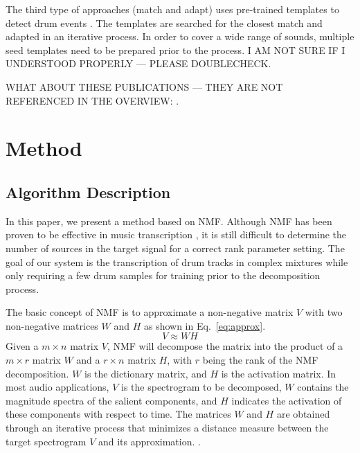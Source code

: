 \documentclass{article}
\begin{document}
The third type of approaches (match and adapt) uses pre-trained templates to detect drum events \cite{yoshii_automatic_2004, yoshii_drum_2007}. The templates are searched for the closest match and adapted in an iterative process. In order to cover a wide range of sounds, multiple seed templates need to be prepared prior to the process. I AM NOT SURE IF I UNDERSTOOD PROPERLY --- PLEASE DOUBLECHECK.
 
WHAT ABOUT THESE PUBLICATIONS --- THEY ARE NOT REFERENCED IN THE OVERVIEW: \cite{scholler_sparse_2011}.

\section{Method}\label{sec:method}
\subsection{Algorithm Description}\label{subsec:algorithm description}

In this paper, we present a method based on NMF. Although NMF has been proven to be effective in music transcription \cite{smaragdis_non-negative_2003}, it is still difficult to determine the number of sources in the target signal for a correct rank parameter setting. The goal of our system is the transcription of drum tracks in complex mixtures while only requiring a few drum samples for training prior to the decomposition process. 

The basic concept of NMF is to approximate a non-negative matrix $V$ with two non-negative matrices $W$ and $H$ as shown in Eq.~\eqref{eq:approx}.
\begin{equation}
V \approx WH
\label{eq:approx}
\end{equation}
Given a $m \times n$ matrix $V$, NMF will decompose the matrix into the product of a $m \times r$ matrix $W$ and a $r \times n$ matrix $H$, with $r$ being the rank of the NMF decomposition. $W$ is the dictionary matrix, and $H$ is the activation matrix. In most audio applications, $V$ is the spectrogram to be decomposed, $W$ contains the magnitude spectra of the salient components, and $H$ indicates the activation of these components with respect to time. The matrices $W$ and $H$ are obtained through an iterative process that minimizes a distance measure between the target spectrogram $V$ and its approximation. \cite{lee_algorithms_2000}. 
\end{document}
